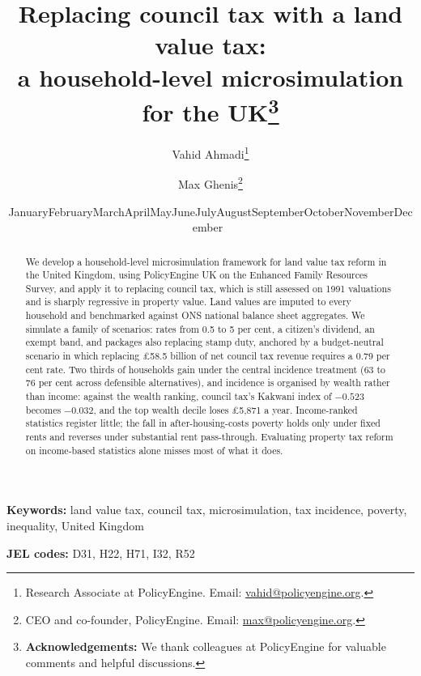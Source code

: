 \documentclass[11pt]{article}
\title{\bfseries Replacing council tax with a land value tax:\\[0.15cm] a household-level microsimulation for the UK\thanks{\textbf{Acknowledgements:} We thank colleagues at PolicyEngine for valuable comments and helpful discussions.}\\[0.7cm]}
\author{Vahid Ahmadi\thanks{Research Associate at PolicyEngine. Email: \href{mailto:vahid@policyengine.org}{vahid@policyengine.org}.}
\and Max Ghenis\thanks{CEO and co-founder, PolicyEngine. Email: \href{mailto:max@policyengine.org}{max@policyengine.org}.}}
\date{\small \ifcase\month\or January\or February\or March\or April\or May\or June\or July\or August\or September\or October\or November\or December\fi\ \the\year}
\begin{document}
\maketitle

\begin{abstract}
\noindent We develop a household-level microsimulation framework for land value tax reform in the United Kingdom, using PolicyEngine UK on the Enhanced Family Resources Survey, and apply it to replacing council tax, which is still assessed on 1991 valuations and is sharply regressive in property value. Land values are imputed to every household and benchmarked against ONS national balance sheet aggregates. We simulate a family of scenarios: rates from 0.5 to 5 per cent, a citizen's dividend, an exempt band, and packages also replacing stamp duty, anchored by a budget-neutral scenario in which replacing \pounds 58.5 billion of net council tax revenue requires a 0.79 per cent rate. Two thirds of households gain under the central incidence treatment (63 to 76 per cent across defensible alternatives), and incidence is organised by wealth rather than income: against the wealth ranking, council tax's Kakwani index of $-0.523$ becomes $-0.032$, and the top wealth decile loses \pounds 5{,}871 a year. Income-ranked statistics register little; the fall in after-housing-costs poverty holds only under fixed rents and reverses under substantial rent pass-through. Evaluating property tax reform on income-based statistics alone misses most of what it does.
\end{abstract}

\medskip
\noindent\textbf{Keywords:} land value tax, council tax, microsimulation, tax incidence, poverty, inequality, United Kingdom

\medskip
\noindent\textbf{JEL codes:} D31, H22, H71, I32, R52

\newpage







\newpage


\newpage

\end{document}
